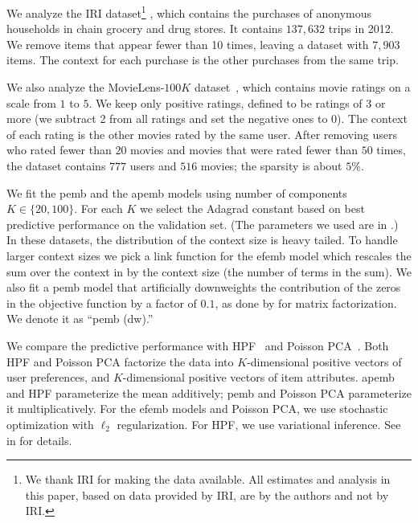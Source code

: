 \documentclass[12pt]{article}
\begin{document}
 We analyze the IRI dataset\footnote{We
  thank IRI for making
  the data available. All estimates and analysis in this paper, based
  on data provided by IRI, are by the authors and not by IRI.}
\citep{Bronnenberg2008}, which contains the purchases of anonymous
households in chain grocery and drug stores. It contains $137,632$
trips in 2012. We remove items that appear fewer than 10 times,
leaving a dataset with $7,903$ items. The context for each purchase is
the other purchases from the same trip.

 We also analyze the MovieLens-$100K$
dataset~\citep{harper2015movielens}, which contains movie ratings on a
scale from $1$ to $5$. We keep only positive ratings, defined to be
ratings of 3 or more (we subtract 2 from all ratings and set the negative ones to 0). 
The context of each rating is the other movies rated by the same user. After
removing users who rated fewer than $20$ movies
and movies that were rated fewer than $50$ times, the dataset contains
$777$ users and $516$ movies; the sparsity is about $5\%$.

 We fit the \gls{pemb} and the \gls{apemb} models
using number of components $K \in \{20, 100\}$. 
For each $K$ we select the Adagrad constant based on best predictive 
performance on the validation set. (The parameters we used are in .)  
In these datasets, the distribution of the context size is heavy tailed. To handle
larger context sizes we pick a link function for the \gls{efemb}
model which rescales the sum over the context in  by the
context size (the number of terms in the sum).
We also fit a \gls{pemb} model that artificially downweights the contribution of
the zeros in the objective function by a factor of $0.1$, 
as done by \citet{hu2008} for matrix factorization.
We denote it as ``\gls{pemb} (dw).''

We compare the predictive performance with
\gls{HPF}~\citep{Gopalan2015} and Poisson
\gls{PCA}~\citep{collins2001generalization}. Both \gls{HPF} and
Poisson \gls{PCA} factorize the data into $K$-dimensional positive vectors of user
preferences, and $K$-dimensional positive vectors of item attributes.
\gls{apemb} and \gls{HPF} parameterize the mean additively; \gls{pemb}
and Poisson \gls{PCA} parameterize it multiplicatively. For the
\gls{efemb} models and Poisson \gls{PCA}, we use stochastic
optimization with $\ell_2$ regularization. For \gls{HPF}, we use
variational inference. See  in  for
details.
\end{document}
